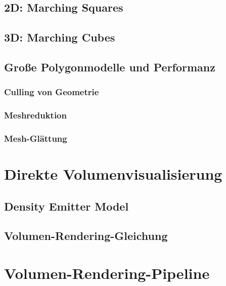 \documentclass[a4paper, 11pt, accentcolor = tud3b]{tudreport}
\begin{document}
			\subsection{2D: Marching Squares} %

			\subsection{3D: Marching Cubes} %

			\subsection{Große Polygonmodelle und Performanz} %

				\subsubsection{Culling von Geometrie} %

				\subsubsection{Meshreduktion} %

				\subsubsection{Mesh-Glättung} %

		\section{Direkte Volumenvisualisierung} %

			\subsection{Density Emitter Model} %

			\subsection{Volumen-Rendering-Gleichung} %

		\section{Volumen-Rendering-Pipeline} %
\end{document}
